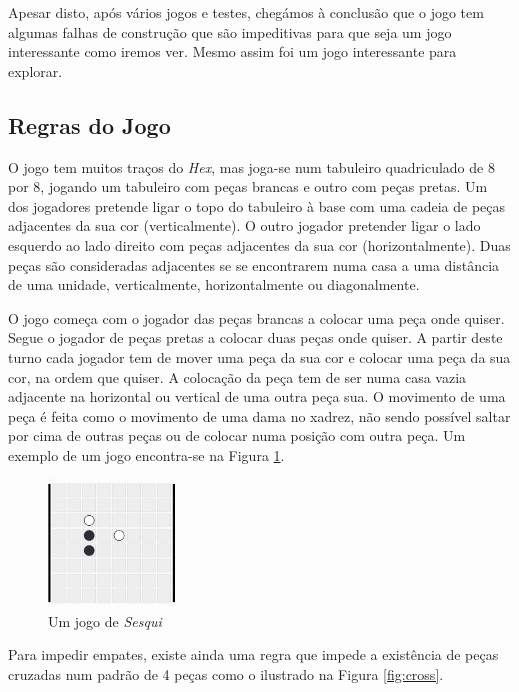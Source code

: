 \documentclass[12pt,a4paper,oneside]{article}
\begin{document}
Apesar disto, após vários jogos e testes, chegámos à conclusão que o
jogo tem algumas falhas de construção que são impeditivas para que
seja um jogo interessante como iremos ver. Mesmo assim foi um jogo
interessante para explorar.

\subsection{Regras do Jogo}

O jogo tem muitos traços do \textit{Hex}, mas joga-se num tabuleiro
quadriculado de 8 por 8, jogando um tabuleiro com peças brancas e
outro com peças pretas. Um dos jogadores pretende ligar o topo do
tabuleiro à base com uma cadeia de peças adjacentes da sua cor
(verticalmente). O outro jogador pretender ligar o lado esquerdo ao
lado direito com peças adjacentes da sua cor (horizontalmente). Duas
peças são consideradas adjacentes se se encontrarem numa casa a uma
distância de uma unidade, verticalmente, horizontalmente ou
diagonalmente.

O jogo começa com o jogador das peças brancas a colocar uma peça onde
quiser. Segue o jogador de peças pretas a colocar duas peças onde
quiser. A partir deste turno cada jogador tem de mover uma peça da sua
cor e colocar uma peça da sua cor, na ordem que quiser. A colocação da
peça tem de ser numa casa vazia adjacente na horizontal ou vertical de
uma outra peça sua. O movimento de uma peça é feita como o movimento
de uma dama no xadrez, não sendo possível saltar por cima de outras
peças ou de colocar numa posição com outra peça. Um exemplo de um jogo
encontra-se na Figura \ref{fig:sesqui}.

\begin{figure}[!htb]
  \centering
  \includegraphics[width=0.3\textwidth]{sesqui_game}
  \caption{Um jogo de \textit{Sesqui}}
  \label{fig:sesqui}
\end{figure}

Para impedir empates, existe ainda uma regra que impede a existência
de peças cruzadas num padrão de 4 peças como o ilustrado na Figura
\ref{fig:cross}.
\end{document}
